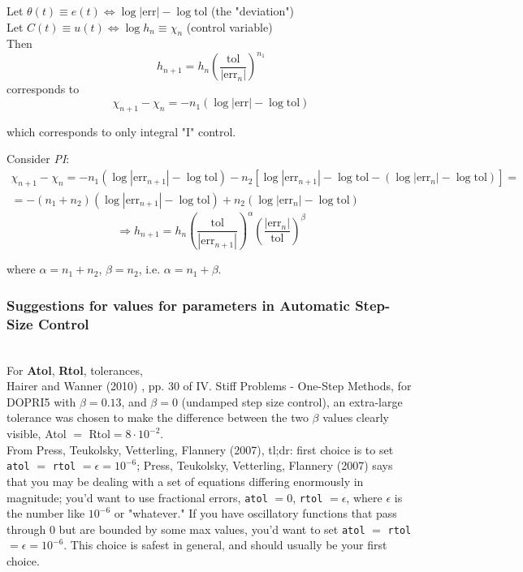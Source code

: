 \documentclass[10pt]{amsart}
\begin{document}
\begin{multicols*}{2}
Let $\theta(t) \equiv e(t) \Leftrightarrow \log{ |\text{err} | } - \log{\text{tol}}$ (the "deviation") \\
Let $C(t) \equiv u(t) \Leftrightarrow \log{h_n} \equiv \chi_n$ (control variable) \\
Then 
\[
h_{n+1} = h_n \left( \frac{ \text{tol}}{ |\text{err}_n | } \right)^{n_1}
\]
corresponds to
\[
\chi_{n+1} - \chi_n = -n_1 ( \log{| \text{err} | } - \log{\text{tol}} )
\]

which corresponds to only integral "I" control.

Consider \emph{PI}:
\[
\begin{gathered}
	\chi_{n+1} - \chi_n = -n_1(\log{ |\text{err}_{n+1}| } - \log{ \text{tol} }) - n_2 \left[ \log{ |\text{err}_{n+1} | } - \log{\text{tol} } - ( \log{ | \text{err}_n| } - \log{ \text{tol} })\right] = \\
	= -(n_1 + n_2) (\log{ |\text{err}_{n+1} | } - \log{\text{tol} }) + n_2 (\log{ |\text{err}_n |} - \log{\text{tol}})
\end{gathered}
\]
\begin{equation}
	\Longrightarrow h_{n+1} = h_n \left( \frac{\text{tol}}{ |\text{err}_{n + 1} | } \right)^{\alpha} \left( \frac{ |\text{err}_n | }{ \text{tol} } \right)^{\beta}
\end{equation}

where $\alpha = n_1 + n_2$, $\beta = n_2$, i.e. $\alpha = n_1 + \beta$.

\subsubsection{Suggestions for values for parameters in Automatic Step-Size Control} \quad \\

For \textbf{Atol}, \textbf{Rtol}, tolerances, \\
Hairer and Wanner (2010) \cite{HaWa2010}, pp. 30 of IV. Stiff Problems - One-Step Methods, for DOPRI5 with $\beta = 0.13$, and $\beta = 0$ (undamped step size control), an extra-large tolerance was chosen to make the difference between the two $\beta$ values clearly visible, Atol $=$ Rtol$ = 8\cdot 10^{-2}$. \\
From Press, Teukolsky, Vetterling, Flannery (2007)\cite{PTVF2007}, tl;dr: first choice is to set \verb|atol| $=$ \verb|rtol| $= \epsilon = 10^{-6}$; Press, Teukolsky, Vetterling, Flannery (2007)\cite{PTVF2007} says that you may be dealing with a set of equations differing enormously in magnitude; you'd want to use fractional errors, \verb|atol| $= 0$, \verb|rtol| $=\epsilon$, where $\epsilon$ is the number like $10^{-6}$ or "whatever." If you have oscillatory functions that pass through 0 but are bounded by some max values, you'd want to set \verb|atol| $=$ \verb|rtol| $= \epsilon = 10^{-6}$. This choice is safest in general, and should usually be your first choice.  \\


\end{multicols*}
\end{document}
